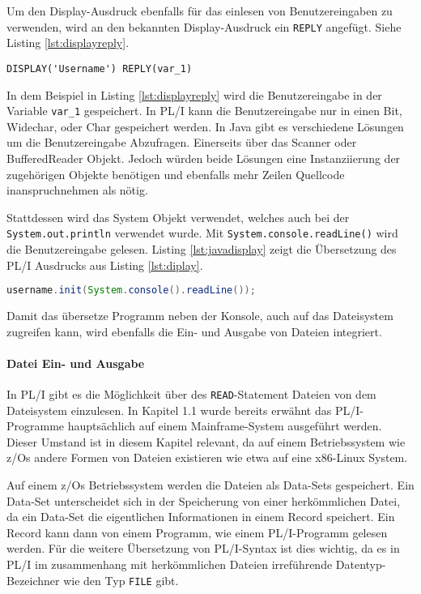 Um den Display-Ausdruck ebenfalls für das einlesen von Benutzereingaben zu verwenden, wird an den bekannten Display-Ausdruck ein \verb+REPLY+ angefügt. Siehe Listing \ref{lst:displayreply}.

\begin{lstlisting}[language=PL/I, caption=Display-Reply-Statments, label={lst:displayreply}]
DISPLAY('Username') REPLY(var_1)
\end{lstlisting} 

In dem Beispiel in Listing \ref{lst:displayreply} wird die Benutzereingabe in der
Variable \verb+var_1+ gespeichert.
In PL/I kann die Benutzereingabe nur in einen Bit, Widechar, oder Char gespeichert
werden. 
In Java gibt es verschiedene Lösungen um die Benutzereingabe Abzufragen.
Einerseits über das Scanner oder BufferedReader Objekt.
Jedoch würden beide Lösungen eine Instanziierung der zugehörigen Objekte benötigen und ebenfalls mehr Zeilen Quellcode inanspruchnehmen als nötig.

Stattdessen wird das System Objekt verwendet, welches auch bei der \verb+System.out.println+ verwendet wurde.
Mit \verb+System.console.readLine()+ wird die Benutzereingabe gelesen.
Listing \ref{lst:javadisplay} zeigt die Übersetzung des PL/I Ausdrucks aus Listing \ref{lst:diplay}.

\begin{lstlisting}[language=Java, caption=Java übersetzung des Display-Reply-Statments, label={lst:javadisplay}]
username.init(System.console().readLine()); 
\end{lstlisting} 

Damit das übersetze Programm neben der Konsole, auch auf das Dateisystem zugreifen kann, wird ebenfalls die Ein- und Ausgabe von Dateien integriert.

\paragraph{Datei Ein- und Ausgabe}
In PL/I gibt es die Möglichkeit über des \verb+READ+-Statement Dateien von dem Dateisystem einzulesen.
In Kapitel 1.1 wurde bereits erwähnt das PL/I-Programme hauptsächlich auf einem Mainframe-System ausgeführt werden.
Dieser Umstand ist in diesem Kapitel relevant, da auf einem Betriebssystem wie z/Os andere Formen von Dateien existieren wie etwa auf eine x86-Linux System.

Auf einem z/Os Betriebssystem werden die Dateien als Data-Sets gespeichert.
Ein Data-Set unterscheidet sich in der Speicherung von einer herkömmlichen Datei, da ein Data-Set die eigentlichen Informationen in einem Record speichert. 
Ein Record kann dann von einem Programm, wie einem PL/I-Programm gelesen werden.
Für die weitere Übersetzung von PL/I-Syntax ist dies wichtig, da es in PL/I im zusammenhang mit herkömmlichen Dateien irreführende Datentyp-Bezeichner wie den Typ \verb+FILE+ gibt.


